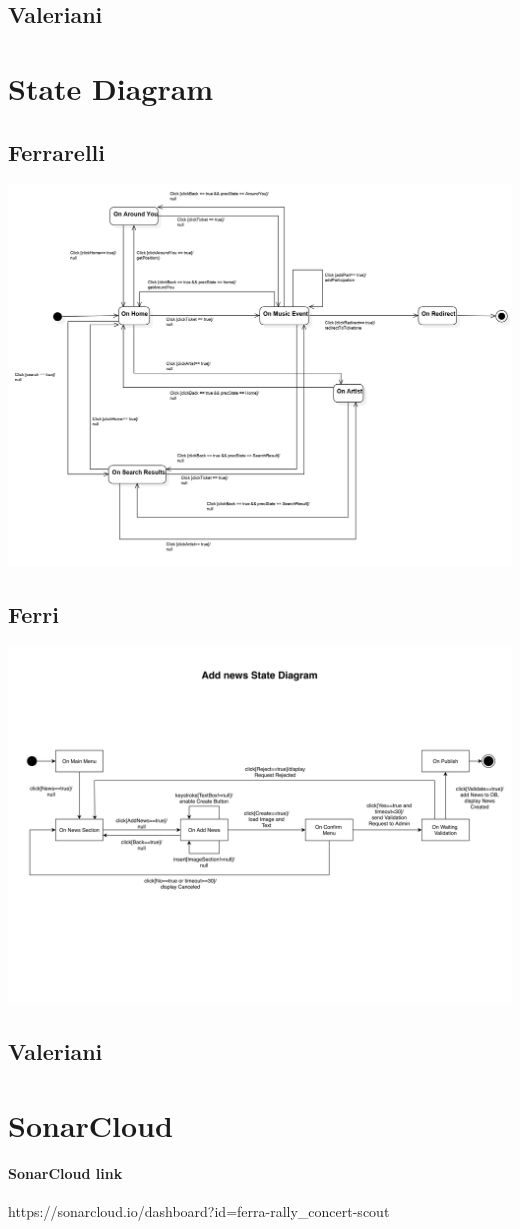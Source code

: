 \documentclass[11pt,a4paper]{article}
\begin{document}
\subsection{Valeriani}
\section{State Diagram}
\subsection{Ferrarelli}
\includegraphics[scale=0.4]{SDFerrarelli.jpg}
\subsection{Ferri}
\includegraphics[scale=0.2]{SDFerri.jpg}
\subsection{Valeriani}
\section{SonarCloud}
\paragraph{SonarCloud link} https://sonarcloud.io/dashboard?id=ferra-rally\_concert-scout
\end{document}
